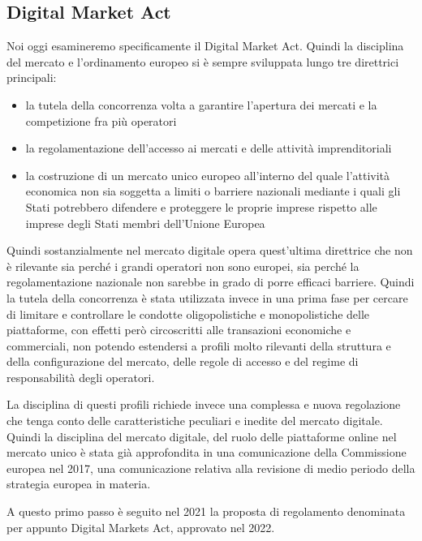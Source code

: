 \subsection{Digital Market Act}
Noi oggi esamineremo specificamente il Digital Market Act.
Quindi la disciplina del mercato e l'ordinamento europeo si è sempre sviluppata lungo tre direttrici principali:

\begin{itemize}
    \item la tutela della concorrenza volta a garantire l'apertura dei mercati e la competizione fra più operatori
    \item la regolamentazione dell'accesso ai mercati e delle attività imprenditoriali
    \item la costruzione di un mercato unico europeo all'interno del quale l'attività economica non sia soggetta a limiti o barriere nazionali mediante i quali gli Stati potrebbero difendere e proteggere le proprie imprese rispetto alle imprese degli Stati membri dell'Unione Europea  
\end{itemize}

Quindi sostanzialmente nel mercato digitale opera quest'ultima direttrice che non è rilevante sia perché i grandi operatori non sono europei, sia perché la regolamentazione nazionale non sarebbe in grado di porre efficaci barriere.
Quindi la tutela della concorrenza è stata utilizzata invece in una prima fase per cercare di limitare e controllare le condotte oligopolistiche e monopolistiche delle piattaforme, con effetti però circoscritti alle transazioni economiche e commerciali, non potendo estendersi a profili molto rilevanti della struttura e della configurazione del mercato, delle regole di accesso e del regime di responsabilità degli operatori.


La disciplina di questi profili richiede invece una complessa e nuova regolazione che tenga conto delle caratteristiche peculiari e inedite del mercato digitale.
Quindi la disciplina del mercato digitale, del ruolo delle piattaforme online nel mercato unico è stata già approfondita in una comunicazione della Commissione europea nel 2017, una comunicazione relativa alla revisione di medio periodo della strategia europea in materia.

A questo primo passo è seguito nel 2021 la proposta di regolamento denominata per appunto Digital Markets Act, approvato nel 2022.

